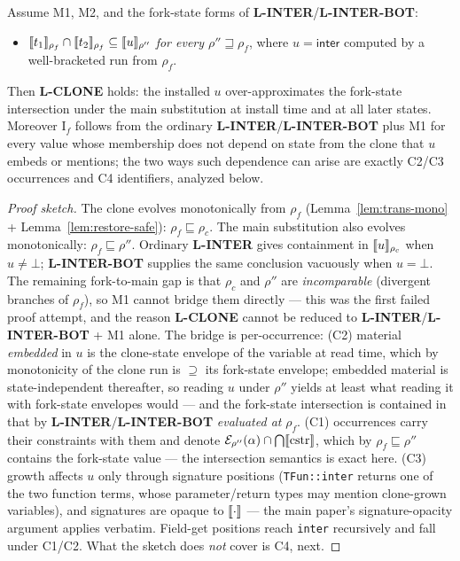 \documentclass[11pt]{article}
\newcommand{\env}[2]{\mathcal{E}_{#1}(#2)}   %
\newcommand{\stle}{\sqsubseteq}              %
\begin{document}
\begin{theorem}
\label{thm:lclone}
Assume M1, M2, and the fork-state forms of
\textbf{L-INTER}/\textbf{L-INTER-BOT}:
\begin{itemize}
\item[\textbf{(I$_f$)}] $\llbracket t_1 \rrbracket_{\rho_f} \cap \llbracket t_2 \rrbracket_{\rho_f}
  \subseteq \llbracket u \rrbracket_{\rho''}$ \emph{for every $\rho'' \sqsupseteq
  \rho_f$}, where $u = \mathsf{inter}$ computed by a well-bracketed run
  from $\rho_f$.
\end{itemize}
Then \textbf{L-CLONE} holds: the installed $u$ over-approximates the
fork-state intersection under the main substitution at install time and
at all later states. Moreover I$_f$ follows from the ordinary
\textbf{L-INTER}/\textbf{L-INTER-BOT} plus M1 for every value whose membership does not
depend on state from the clone that $u$ embeds or mentions; the two ways such
dependence can arise are exactly C2/C3 occurrences and C4 identifiers,
analyzed below.
\end{theorem}
\begin{proof}[Proof sketch]
The clone evolves monotonically from $\rho_f$
(Lemma~\ref{lem:trans-mono} + Lemma~\ref{lem:restore-safe}):
$\rho_f \stle \rho_c$. The main substitution also evolves monotonically:
$\rho_f \stle \rho''$. Ordinary \textbf{L-INTER} gives containment in
$\llbracket u \rrbracket_{\rho_c}$ when $u \neq \bot$; \textbf{L-INTER-BOT} supplies the
same conclusion vacuously when $u = \bot$. The remaining fork-to-main gap
is that $\rho_c$ and $\rho''$ are
\emph{incomparable} (divergent branches of $\rho_f$), so M1 cannot bridge
them directly — this was the first failed proof attempt, and the reason
\textbf{L-CLONE} cannot be reduced to \textbf{L-INTER}/\textbf{L-INTER-BOT}
+ M1 alone.
The bridge is per-occurrence: (C2) material \emph{embedded} in $u$ is the
clone-state envelope of the variable at read time, which by monotonicity
of the clone run is $\supseteq$ its fork-state envelope; embedded material
is state-independent thereafter, so reading $u$ under $\rho''$ yields at
least what reading it with fork-state envelopes would — and the
fork-state intersection is contained in that by
\textbf{L-INTER}/\textbf{L-INTER-BOT}
\emph{evaluated at} $\rho_f$. (C1) occurrences carry their constraints
with them and denote
$\env{\rho''}{\alpha} \cap \bigcap\sem{\mathrm{cstr}}$, which by
$\rho_f \stle \rho''$ contains the fork-state value — the intersection
semantics is exact here. (C3) growth affects $u$ only through signature
positions (\texttt{TFun::inter} returns one of the two function terms,
whose parameter/return types may mention clone-grown variables), and
signatures are opaque to $\llbracket \cdot \rrbracket$ — the main paper's
signature-opacity argument applies verbatim. Field-get positions reach
\texttt{inter} recursively and fall under C1/C2. What the sketch does
\emph{not} cover is C4, next.
\end{proof}
\end{document}

